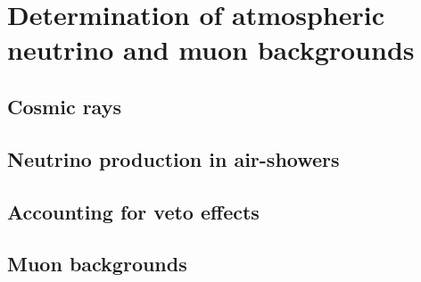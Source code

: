 \chapter{Determination of atmospheric neutrino and muon backgrounds}

\section{Cosmic rays}

\section{Neutrino production in air-showers}

\section{Accounting for veto effects}

\section{Muon backgrounds}
